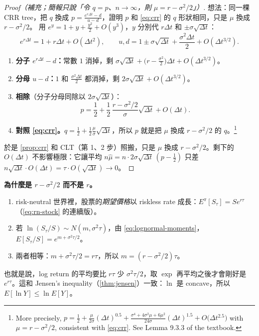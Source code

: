\suppstart
\begin{proof}[Proof（補充；簡報只說「令 $q=p$、$n\to\infty$，則 $\mu=r-\sigma^{2}/2$」）]
	想法：同一棵 CRR tree，把 $q$ 換成 $p=\frac{e^{r\Delta t}-d}{u-d}$，證明 $p$ 和 \eqref{eq:crr} 的 $q$ 形狀相同，只是 $\mu$ 換成 $r-\sigma^{2}/2$。
	用 $e^{y}=1+y+\frac{y^{2}}{2}+O(y^{3})$，$y$ 分別代 $r\Delta t$ 和 $\pm\sigma\sqrt{\Delta t}$：
	\[
		e^{r\Delta t}=1+r\Delta t+O(\Delta t^{2}) ,
		\qquad
		u,d=1\pm\sigma\sqrt{\Delta t}+\frac{\sigma^{2}\Delta t}{2}+O(\Delta t^{3/2}) .
	\]
	\begin{enumerate}[(1),nosep]
		\item \textbf{分子 $e^{r\Delta t}-d$：}常數 $1$ 消掉，剩 $\sigma\sqrt{\Delta t}+\bigl(r-\frac{\sigma^{2}}{2}\bigr)\Delta t+O(\Delta t^{3/2})$。
		\item \textbf{分母 $u-d$：}$1$ 和 $\frac{\sigma^{2}\Delta t}{2}$ 都消掉，剩 $2\sigma\sqrt{\Delta t}+O(\Delta t^{3/2})$。
		\item \textbf{相除}（分子分母同除以 $2\sigma\sqrt{\Delta t}$）：
		\[
			p=\frac12+\frac12\,\frac{r-\sigma^{2}/2}{\sigma}\sqrt{\Delta t}+O(\Delta t) .
		\]
		\item \textbf{對照 \eqref{eq:crr}。}$q=\frac12+\frac12\frac{\mu}{\sigma}\sqrt{\Delta t}$，所以 $p$ 就是把 $\mu$ 換成 $r-\sigma^{2}/2$ 的 $q$。\footnote{More precisely, $p=\frac12+\frac{\mu}{2\sigma}(\Delta t)^{0.5}+\frac{\sigma^{4}+4\sigma^{2}\mu+6\mu^{2}}{24\sigma}(\Delta t)^{1.5}+O\bigl(\Delta t^{2.5}\bigr)$ with $\mu=r-\sigma^{2}/2$, consistent with \eqref{eq:crr}. See Lemma 9.3.3 of the textbook.}
	\end{enumerate}
	於是 \autoref{prop:crr} 和 CLT（第 1、2 步）照搬，只是 $\mu$ 換成 $r-\sigma^{2}/2$。剩下的 $O(\Delta t)$ 不影響極限：它讓平均 $n\hat{\mu}=n\cdot2\sigma\sqrt{\Delta t}\,(p-\frac12)$ 只差 $n\sqrt{\Delta t}\cdot O(\Delta t)=\tau\cdot O(\sqrt{\Delta t})\to0$。
\end{proof}

\begin{remark}[第 3 步的直觀]
	\textbf{為什麼是 $r-\sigma^{2}/2$ 而不是 $r$。}
	\begin{enumerate}[(1),nosep]
		\item risk-neutral 世界裡，股票的\emph{期望價格}以 riskless rate 成長：$E^{\pi}[S_{\tau}]=Se^{r\tau}$（\eqref{eq:rn-stock} 的連續版）。
		\item 若 $\ln(S_{\tau}/S)\sim N(m,\sigma^{2}\tau)$，由 \eqref{eq:lognormal-moments}，$E[S_{\tau}/S]=e^{m+\sigma^{2}\tau/2}$。
		\item 兩者相等：$m+\sigma^{2}\tau/2=r\tau$，所以 $m=(r-\sigma^{2}/2)\tau$。
	\end{enumerate}
	也就是說，log return 的平均要比 $r\tau$ 少 $\sigma^{2}\tau/2$，取 $\exp$ 再平均之後才會剛好是 $e^{r\tau}$。這和 Jensen's inequality（\autoref{thm:jensen}）一致：$\ln$ 是 concave，所以 $E[\ln Y]\le\ln E[Y]$。
\end{remark}
\suppend


